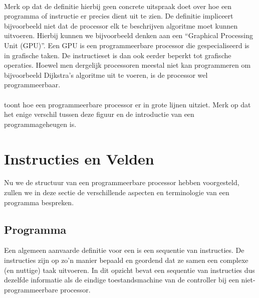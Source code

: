 \paragraph{}
Merk op dat de definitie hierbij geen concrete uitspraak doet over hoe een programma of instructie er precies dient uit te zien. De definitie impliceert bijvoorbeeld niet dat de processor elk te beschrijven algoritme moet kunnen uitvoeren. Hierbij kunnen we bijvoorbeeld denken aan een ``Graphical Processing Unit (GPU)''. Een GPU is een programmeerbare processor die gespecialiseerd is in grafische taken. De instructieset is dan ook eerder beperkt tot grafische operaties. Hoewel men dergelijk processoren meestal niet kan programmeren om bijvoorbeeld Dijkstra's algoritme uit te voeren, is de processor wel programmeerbaar.
\paragraph{}
 toont hoe een programmeerbare processor er in grote lijnen uitziet. Merk op dat het enige verschil tussen deze figuur en  de introductie van een programmageheugen is.
\section{Instructies en Velden}
Nu we de structuur van een programmeerbare processor hebben voorgesteld, zullen we in deze sectie de verschillende aspecten en terminologie van een programma bespreken.
\subsection{Programma}
Een algemeen aanvaarde definitie voor een  is een sequentie van instructies. De instructies zijn op zo'n manier bepaald en geordend dat ze samen een complexe (en nuttige) taak uitvoeren. In dit opzicht bevat een sequentie van instructies dus dezelfde informatie als de eindige toestandsmachine van de controller bij een niet-programmeerbare processor.
